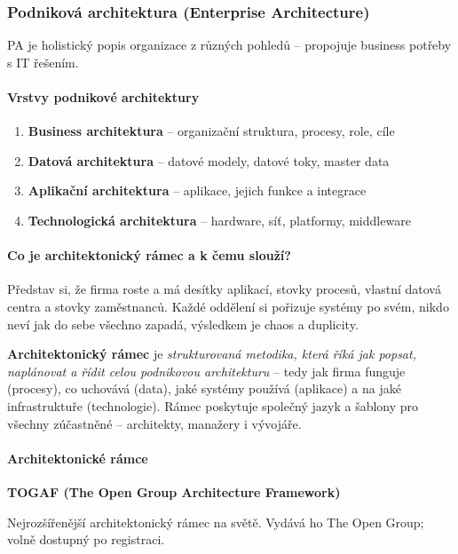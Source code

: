 \subsubsection{Podniková architektura (Enterprise Architecture)}

PA je holistický popis organizace z různých pohledů -- propojuje business potřeby s IT řešením.

\paragraph{Vrstvy podnikové architektury}
\begin{enumerate}
  \item \textbf{Business architektura} -- organizační struktura, procesy, role, cíle
  \item \textbf{Datová architektura} -- datové modely, datové toky, master data
  \item \textbf{Aplikační architektura} -- aplikace, jejich funkce a integrace
  \item \textbf{Technologická architektura} -- hardware, síť, platformy, middleware
\end{enumerate}

\paragraph{Co je architektonický rámec a k čemu slouží?}

Představ si, že firma roste a má desítky aplikací, stovky procesů, vlastní datová centra
a stovky zaměstnanců. Každé oddělení si pořizuje systémy po svém, nikdo neví jak do sebe
všechno zapadá, výsledkem je chaos a duplicity.

\textbf{Architektonický rámec} je \textit{strukturovaná metodika, která říká jak popsat, naplánovat
a řídit celou podnikovou architekturu} -- tedy jak firma funguje (procesy), co uchovává (data),
jaké systémy používá (aplikace) a na jaké infrastruktuře (technologie).
Rámec poskytuje společný jazyk a šablony pro všechny zúčastněné -- architekty, manažery i vývojáře.

\paragraph{Architektonické rámce}

\textbf{TOGAF (The Open Group Architecture Framework)}

Nejrozšířenější architektonický rámec na světě. Vydává ho The Open Group; volně dostupný po registraci.

